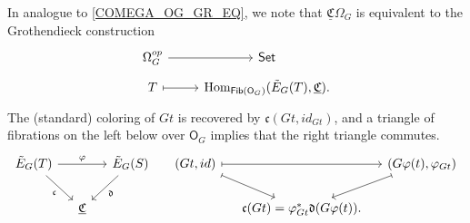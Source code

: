 \documentclass[a4paper,10pt
,draft
]{article}%
\renewcommand{\phi}{\varphi}
\newcommand{\UC}{\underline{\mathfrak C}}
\renewcommand{\1}{\ensuremath{\mathbb{id}}}
\begin{document}
\begin{remark}
      In analogue to \eqref{COMEGA_OG_GR_EQ}, we note that $\UC \Omega_G$ is equivalent to the Grothendieck construction
      \begin{equation}
            \label{COMEGAG_OG_GR_EQ}
            \begin{tikzcd}[row sep = tiny]
                  \Omega_G^{op} \arrow[r]
                  &
                  \mathsf{Set}
                  \\
                  T \arrow[r, mapsto]
                  &
                  \Hom_{\mathsf{Fib} (\mathsf O_G)}(\tilde E_G(T), \UC).
            \end{tikzcd}
      \end{equation}
      The (standard) coloring of $G t$ is recovered by $\mathfrak c(G t, id_{G t})$, and
      a triangle of fibrations on the left below over $\mathsf O_G$
      implies that the right triangle commutes.
      \begin{equation}
            \begin{tikzcd}[column sep = small]
                  \tilde E_G(T) \arrow[rr, "\phi"] \arrow[dr, "\mathfrak c"']
                  &&
                  \tilde E_G(S) \arrow[dl, "\mathfrak d"]
                  &
                  (G t, id) \arrow[rr, mapsto] \arrow[dr, mapsto]
                  &&
                  (G \phi(t), \phi_{G t}) \arrow[dl, mapsto]
                  \\
                  &
                  \UC
                  &
                  &
                  &
                  \mathfrak c(G t) = \phi_{G t}^{\**} \mathfrak d(G \phi(t)).
            \end{tikzcd}
      \end{equation}
\end{remark}
\end{document}
